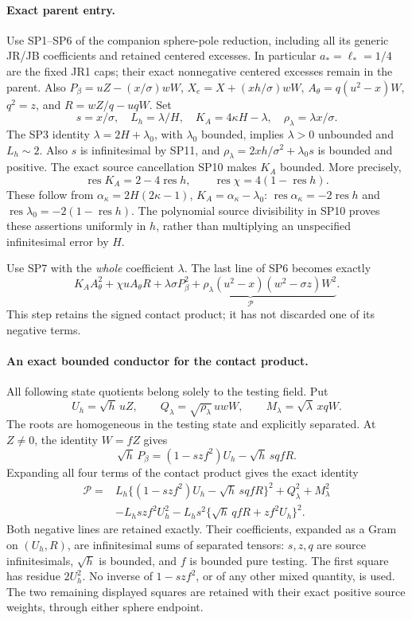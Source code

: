 \paragraph{Exact parent entry.}
Use SP1--SP6 of the companion sphere-pole reduction, including all its
generic JR/JB coefficients and retained centered excesses. In particular
$a_*=\ell_*=1/4$ are the fixed JR1 caps; their exact nonnegative
centered excesses remain in the parent. Also
$P_\beta=uZ-(x/\sigma)wW$, $X_e=X+(xh/\sigma)wW$,
$A_\theta=q(u^2-x)W$, $q^2=z$, and $R=wZ/q-uqW$.
Set
\[
 s=x/\sigma,\quad L_h=\lambda/H,\quad
 K_A=4\kappa H-\lambda,\quad \rho_\lambda=\lambda x/\sigma.
\]
The SP3 identity $\lambda=2H+\lambda_0$, with $\lambda_0$ bounded,
implies $\lambda>0$ unbounded and $L_h\sim2$.
Also $s$ is infinitesimal by SP11, and
$\rho_\lambda=2xh/\sigma^2+\lambda_0s$ is bounded and positive.
The exact source cancellation SP10 makes $K_A$ bounded. More precisely,
\[
 \operatorname{res}K_A=2-4\operatorname{res}h,\qquad
 \operatorname{res}\chi=4(1-\operatorname{res}h).
 \tag{BS1}
\]
These follow from $\alpha_\kappa=2H(2\kappa-1)$,
$K_A=\alpha_\kappa-\lambda_0$:
$\operatorname{res}\alpha_\kappa=-2\operatorname{res}h$ and
$\operatorname{res}\lambda_0=-2(1-\operatorname{res}h)$.
The polynomial source divisibility in SP10 proves these assertions
uniformly in $h$, rather than multiplying an unspecified infinitesimal
error by $H$.

Use SP7 with the \emph{whole} coefficient $\lambda$. The last line of
SP6 becomes exactly
\[
 K_A A_\theta^2+\chi uA_\theta R+
 \underbrace{\lambda\sigma P_\beta^2+
       \rho_\lambda(u^2-x)(w^2-\sigma z)W^2}_{\mathscr P}.
 \tag{BS2}
\]
This step retains the signed contact product; it has not discarded
one of its negative terms.

\paragraph{An exact bounded conductor for the contact product.}
All following state quotients belong solely to the testing field.
Put
\[
 U_h=\sqrt h\,uZ,\qquad
 Q_\lambda=\sqrt{\rho_\lambda}\,uwW,\qquad
 M_\lambda=\sqrt\lambda\,xqW.
\]
The roots are homogeneous in the testing state and explicitly separated.
At $Z\ne0$, the identity $W=fZ$ gives
\[
 \sqrt h\,P_\beta=(1-szf^2)U_h-\sqrt h\,sqfR.
 \tag{BS3}
\]
Expanding all four terms of the contact product gives the exact identity
\[
\begin{split}
 \mathscr P={}&L_h\{(1-szf^2)U_h-\sqrt h\,sqfR\}^2
                  +Q_\lambda^2+M_\lambda^2\\
 &-L_hszf^2U_h^2
       -L_hs^2\{\sqrt h\,qfR+zf^2U_h\}^2 .
\end{split}                                                   \tag{BS4}
\]
Both negative lines are retained exactly. Their coefficients, expanded
as a Gram on $(U_h,R)$, are infinitesimal sums of separated tensors:
$s,z,q$ are source infinitesimals, $\sqrt h$ is bounded, and $f$
is bounded pure testing. The first square has residue $2U_h^2$.
No inverse of $1-szf^2$, or of any other mixed quantity, is used.
The two remaining displayed squares are retained with their exact
positive source weights, through either sphere endpoint.

